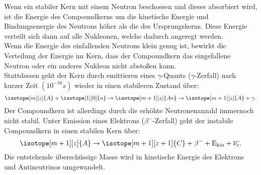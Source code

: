 Wenn ein stabiler Kern mit einem Neutron beschossen und dieses absorbiert wird, ist die Energie des Compoundkerns um die kinetische
Energie und Bindungsenergie des Neutrons höher als die des Ursprungskerns. Diese Energie verteilt sich dann auf alle Nukleonen, welche
dadurch angeregt werden.\\
Wenn die Energie des einfallenden Neutrons klein genug ist, bewirkt die Verteilung der Energie im Kern, dass der Compoundkern das eingefallene
Neutron oder ein anderes Nukleon nicht abstoßen kann. \\
Stattdessen geht der Kern durch emittieren eines $\gamma$-Quants ($\gamma$-Zerfall) nach kurzer Zeit $(10^{-16}\si{s})$ wieder in einen stabileren
Zustand über:
\begin{equation*}
    \isotope[m][z]{A} + \isotope[1][0]{n} \to \isotope[m+1][z]{A*} \to \isotope[m+1][z]{A} + \gamma.
\end{equation*}
Der Compoundkern ist allerdings durch die erhöhte Neutronenanzahl immernoch nicht stabil. Unter Emission eines Elektrons ($\beta ^-$-Zerfall)
geht der instabile Compoundkern in einen stabilen Kern über:
\begin{equation*}
    \isotope[m+1][z]{A} \to \isotope[m+1][z+1]{C} + \beta ^- + \mathrm{E_{kin}} + \overline{\nu_e}.
\end{equation*}
Die entstehende überschüssige Masse wird in kinetische Energie des Elektrons und Antineutrinos umgewandelt.

